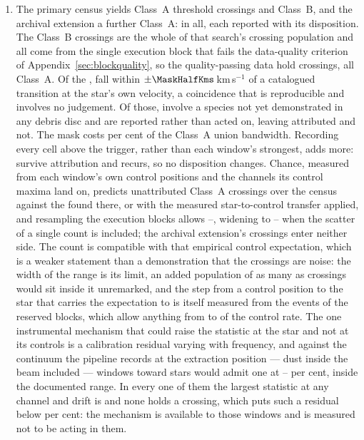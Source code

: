 \begin{enumerate}[leftmargin=1.6em,itemsep=4pt,topsep=4pt,parsep=0pt]
\item The primary census yields \CkNCrossCenA{} Class~A threshold crossings
and \PrFlagXrossWord{} Class~B, and the archival extension a further
\CeNTailCrossWord{} Class~A: \EvNCrossRaw{} in all, each reported with its
disposition. The \PrFlagXrossWord{} Class~B crossings are the whole of that
search's crossing population and all come from the single execution block
that fails the data-quality criterion of Appendix~\ref{sec:blockquality}, so the
quality-passing data hold \EvNCrossQp{} crossings, all Class~A. Of the
\EvNCrossRaw, \MkNCoinc{} fall within $\pm\MaskHalfKms$\,km\,s$^{-1}$ of a
catalogued transition at the star's own velocity, a coincidence that is
reproducible and involves no judgement. Of those, \MkNSODecideWord{} involve
a species not yet demonstrated in any debris disc and are reported rather
than acted on, leaving \MkAttr{} attributed and \MkUnattr{} not. The mask costs
\MkMaskAPct{} per cent of the Class~A union bandwidth. Recording every cell
above the trigger, rather than each window's strongest, adds \CkNSecondary{}
more: \CkNSecUnattrWord{} survive attribution and \CkNRecurWord{} recurs, so
no disposition changes. Chance,
measured from each window's own control positions and the channels its
control maxima land on, predicts
\CeExp{} unattributed Class~A crossings over the census against the \CeObs{}
found there, or \CeExpX{} with the measured star-to-control transfer applied,
and resampling the execution blocks allows \CeLo--\CeHi, widening to
\CeCntLo--\CeCntHi{} when the scatter of a single count is included; the
archival extension's \CeNTailCrossWord{} crossings enter neither side. The count is
compatible with that empirical control expectation, which is a weaker
statement than a demonstration that the crossings are noise: the width of the
range is its limit, an added population of as many as \CeAddBlind{}
crossings would sit inside it unremarked, and the step from a control
position to the star that carries the expectation to \CeExpX{} is itself
measured from the \StHoObs{} events of the reserved blocks, which allow
anything from \StHoLo{} to \StHoHi{} of the control rate. The one instrumental mechanism that
could raise the statistic at the star and not at its controls is a
calibration residual varying with frequency, and against the continuum the
pipeline records at the extraction position --- dust inside the beam included
--- \CxNAdmitWord{} windows toward \CxNAdmitStarWord{} stars would admit one at
\CxEpsAdmitLoPct--\CxEpsAdmitHiPct{} per cent, inside the documented range.
In every one of them the largest statistic at any channel and drift is
\CxAdmitTstarHi{} and none holds a crossing, which puts such a residual below
\CxResidHiPct{} per cent: the mechanism is available to those windows and is
measured not to be acting in them.


\end{enumerate}
